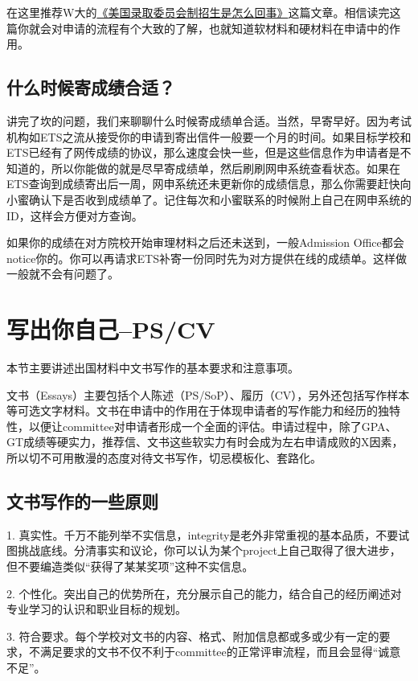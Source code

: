 在这里推荐W大的\href{http://www.1point3acres.com/\%E7\%BE\%8E\%E5\%9B\%BD\%E5\%BD\%95\%E5\%8F\%96\%E5\%A7\%94\%E5\%91\%98\%E4\%BC\%9A\%E5\%88\%B6\%E6\%8B\%9B\%E7\%94\%9F\%E6\%98\%AF\%E6\%80\%8E\%E4\%B9\%88\%E5\%9B\%9E\%E4\%BA\%8B/}{《美国录取委员会制招生是怎么回事》}这篇文章。相信读完这篇你就会对申请的流程有个大致的了解，也就知道软材料和硬材料在申请中的作用。

\subsection{什么时候寄成绩合适？}
讲完了坎的问题，我们来聊聊什么时候寄成绩单合适。当然，早寄早好。因为考试机构如ETS之流从接受你的申请到寄出信件一般要一个月的时间。如果目标学校和ETS已经有了网传成绩的协议，那么速度会快一些，但是这些信息作为申请者是不知道的，所以你能做的就是尽早寄成绩单，然后刷刷网申系统查看状态。如果在ETS查询到成绩寄出后一周，网申系统还未更新你的成绩信息，那么你需要赶快向小蜜确认下是否收到成绩单了。记住每次和小蜜联系的时候附上自己在网申系统的ID，这样会方便对方查询。\par
如果你的成绩在对方院校开始审理材料之后还未送到，一般Admission Office都会notice你的。你可以再请求ETS补寄一份同时先为对方提供在线的成绩单。这样做一般就不会有问题了。
\section{写出你自己--PS/CV}
本节主要讲述出国材料中文书写作的基本要求和注意事项。\par

文书（Essays）主要包括个人陈述（PS/SoP）、履历（CV），另外还包括写作样本等可选文字材料。文书在申请中的作用在于体现申请者的写作能力和经历的独特性，以便让committee对申请者形成一个全面的评估。申请过程中，除了GPA、GT成绩等硬实力，推荐信、文书这些软实力有时会成为左右申请成败的X因素，所以切不可用散漫的态度对待文书写作，切忌模板化、套路化。
\subsection{文书写作的一些原则}

1. 真实性。千万不能列举不实信息，integrity是老外非常重视的基本品质，不要试图挑战底线。分清事实和议论，你可以认为某个project上自己取得了很大进步，但不要编造类似“获得了某某奖项”这种不实信息。\par
2. 个性化。突出自己的优势所在，充分展示自己的能力，结合自己的经历阐述对专业学习的认识和职业目标的规划。\par
3. 符合要求。每个学校对文书的内容、格式、附加信息都或多或少有一定的要求，不满足要求的文书不仅不利于committee的正常评审流程，而且会显得“诚意不足”。

